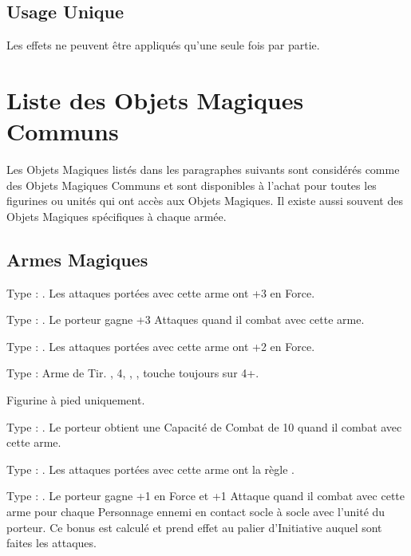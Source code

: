 \subsection{Usage Unique}

Les effets ne peuvent être appliqués qu'une seule fois par partie.

\section{Liste des Objets Magiques Communs}

Les Objets Magiques listés dans les paragraphes suivants sont considérés comme des Objets Magiques Communs et sont disponibles à l'achat pour toutes les figurines ou unités qui ont accès aux Objets Magiques. Il existe aussi souvent des Objets Magiques spécifiques à chaque armée.

\newpage
\hypertarget{magicalweapons}{\subsection{Armes Magiques}}
\label{magical_weapons}

\startpricelist

Type : \hw{}.  Les attaques portées avec cette arme ont +3 en Force.

Type : \hw{}. Le porteur gagne +3 Attaques quand il combat avec cette arme.

Type : \hw{}. Les attaques portées avec cette arme ont +2 en Force.

Type : Arme de Tir. , \Strength{} 4, , , touche toujours sur 4+.

Figurine à pied uniquement.

Type : \pw{}. Le porteur obtient une Capacité de Combat de 10 quand il combat avec cette arme.

Type : \hw{}. Les attaques portées avec cette arme ont la règle .

Type : \hw{}. Le porteur gagne +1 en Force et +1 Attaque quand il combat avec cette arme pour chaque Personnage ennemi en contact socle à socle avec l'unité du porteur. Ce bonus est calculé et prend effet au palier d'Initiative auquel sont faites les attaques.

